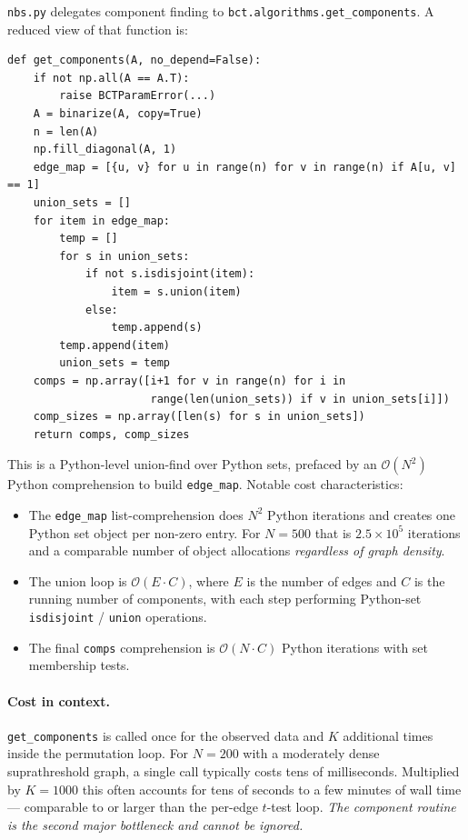 \documentclass[11pt]{article}
\begin{document}
\texttt{nbs.py} delegates component finding to \texttt{bct.algorithms.get\_components}. A reduced view of that function is:
%
\begin{lstlisting}
def get_components(A, no_depend=False):
    if not np.all(A == A.T):
        raise BCTParamError(...)
    A = binarize(A, copy=True)
    n = len(A)
    np.fill_diagonal(A, 1)
    edge_map = [{u, v} for u in range(n) for v in range(n) if A[u, v] == 1]
    union_sets = []
    for item in edge_map:
        temp = []
        for s in union_sets:
            if not s.isdisjoint(item):
                item = s.union(item)
            else:
                temp.append(s)
        temp.append(item)
        union_sets = temp
    comps = np.array([i+1 for v in range(n) for i in
                      range(len(union_sets)) if v in union_sets[i]])
    comp_sizes = np.array([len(s) for s in union_sets])
    return comps, comp_sizes
\end{lstlisting}

This is a Python-level union-find over Python sets, prefaced by an $\mathcal{O}(N^2)$ Python comprehension to build \texttt{edge\_map}. Notable cost characteristics:

\begin{itemize}[leftmargin=2.0em]
\item The \texttt{edge\_map} list-comprehension does $N^2$ Python iterations and creates one Python set object per non-zero entry. For $N=500$ that is $2.5\times10^5$ iterations and a comparable number of object allocations \emph{regardless of graph density}.
\item The union loop is $\mathcal{O}(E \cdot C)$, where $E$ is the number of edges and $C$ is the running number of components, with each step performing Python-set \texttt{isdisjoint} / \texttt{union} operations.
\item The final \texttt{comps} comprehension is $\mathcal{O}(N \cdot C)$ Python iterations with set membership tests.
\end{itemize}

\paragraph{Cost in context.} \texttt{get\_components} is called once for the observed data and $K$ additional times inside the permutation loop. For $N=200$ with a moderately dense suprathreshold graph, a single call typically costs tens of milliseconds. Multiplied by $K=1000$ this often accounts for tens of seconds to a few minutes of wall time --- comparable to or larger than the per-edge $t$-test loop. \emph{The component routine is the second major bottleneck and cannot be ignored.}
\end{document}
